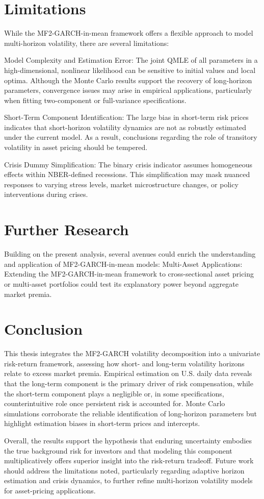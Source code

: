 \documentclass[12pt]{article}
\begin{document}
\section{Limitations}
While the MF2-GARCH-in-mean framework offers a flexible approach to model multi-horizon volatility, there are several limitations:\par
Model Complexity and Estimation Error: The joint QMLE of all parameters in a high-dimensional, nonlinear likelihood can be sensitive to initial values and local optima. Although the Monte Carlo results support the recovery of long-horizon parameters, convergence issues may arise in empirical applications, particularly when fitting two-component or full-variance specifications.\par
Short-Term Component Identification: The large bias in short-term risk prices indicates that short-horizon volatility dynamics are not as robustly estimated under the current model. As a result, conclusions regarding the role of transitory volatility in asset pricing should be tempered.\par
Crisis Dummy Simplification: The binary crisis indicator assumes homogeneous effects within NBER-defined recessions. This simplification may mask nuanced responses to varying stress levels, market microstructure changes, or policy interventions during crises.\par
\section{Further Research}
Building on the present analysis, several avenues could enrich the understanding and application of MF2-GARCH-in-mean models:
Multi-Asset Applications: Extending the MF2-GARCH-in-mean framework to cross-sectional asset pricing or multi-asset portfolios could test its explanatory power beyond aggregate market premia.
\section{Conclusion}
This thesis integrates the MF2-GARCH volatility decomposition into a univariate risk-return framework, assessing how short- and long-term volatility horizons relate to excess market premia. Empirical estimation on U.S. daily data reveals that the long-term component is the primary driver of risk compensation, while the short-term component plays a negligible or, in some specifications, counterintuitive role once persistent risk is accounted for. Monte Carlo simulations corroborate the reliable identification of long-horizon parameters but highlight estimation biases in short-term prices and intercepts.\par
Overall, the results support the hypothesis that enduring uncertainty embodies the true background risk for investors and that modeling this component multiplicatively offers superior insight into the risk-return tradeoff. Future work should address the limitations noted, particularly regarding adaptive horizon estimation and crisis dynamics, to further refine multi-horizon volatility models for asset-pricing applications.
\end{document}
